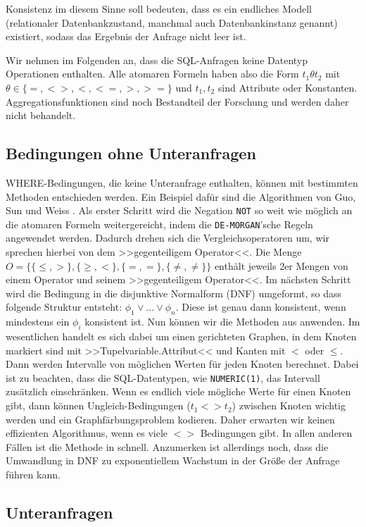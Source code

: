 Konsistenz im diesem Sinne soll bedeuten, dass es ein endliches Modell (relationaler Datenbankzustand, manchmal auch Datenbankinstanz genannt) existiert, sodass das Ergebnis der Anfrage nicht leer ist.

Wir nehmen im Folgenden an, dass die SQL-Anfragen keine Datentyp Operationen enthalten. Alle atomaren Formeln haben also die Form $t_1\theta t_2$ mit $\theta\in \{=,<>,<,<=,>,>=\}$ und $t_1,t_2$ sind Attribute oder Konstanten. Aggregationsfunktionen sind noch Bestandteil der Forschung und werden daher nicht behandelt.

\subsection{Bedingungen ohne Unteranfragen}

WHERE-Bedingungen, die keine Unteranfrage enthalten, können mit bestimmten Methoden entschieden werden. Ein Beispiel dafür sind die Algorithmen von Guo, Sun und Weiss \cite{decideable1}. Als erster Schritt wird die Negation \verb|NOT| so weit wie möglich an die atomaren Formeln weitergereicht, indem die \verb|DE-MORGAN|'sche Regeln angewendet werden. Dadurch drehen sich die Vergleichsoperatoren um, wir sprechen hierbei von dem >>gegenteiligem Operator<<. Die Menge $O=\{ \{\leq,>\} , \{\geq,<\} , \{ =, =\}, \{\neq,\neq\} \}$ enthält jeweils 2er Mengen von einem Operator und seinem >>gegenteiligem Operator<<. Im nächsten Schritt wird die Bedingung in die disjunktive Normalform (DNF) umgeformt, so dass folgende Struktur entsteht: $\phi_1 \vee ... \vee \phi_n$. Diese ist genau dann konsistent, wenn mindestens ein $\phi_i$ konsistent ist. Nun können wir die Methoden aus \cite{decideable1} anwenden. Im wesentlichen handelt es sich dabei um einen gerichteten Graphen, in dem Knoten markiert sind mit >>Tupelvariable.Attribut<< und Kanten mit $<$ oder $\leq$. Dann werden Intervalle von möglichen Werten für jeden Knoten berechnet. Dabei ist zu beachten, dass die SQL-Datentypen, wie \verb|NUMERIC(1)|, das Intervall zusätzlich einschränken.
Wenn es endlich viele mögliche Werte für einen Knoten gibt, dann können Ungleich-Bedingungen ($t_1<>t_2$) zwischen Knoten wichtig werden und ein Graphfärbungsproblem kodieren. Daher erwarten wir keinen effizienten Algorithmus, wenn es viele $<>$ Bedingungen gibt. In allen anderen Fällen ist die Methode in \cite{decideable1} schnell. Anzumerken ist allerdings noch, dass die Umwandlung in DNF zu exponentiellem Wachstum in der Größe der Anfrage führen kann.

\subsection{Unteranfragen}

